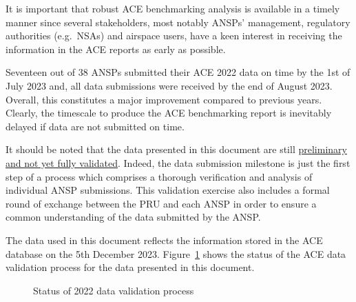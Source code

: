 \documentclass[
  letterpaper,
  DIV=11,
  numbers=noendperiod]{scrreprt}
\begin{document}
It is important that robust ACE benchmarking analysis is available in a
timely manner since several stakeholders, most notably ANSPs'
management, regulatory authorities (e.g.~NSAs) and airspace users, have
a keen interest in receiving the information in the ACE reports as early
as possible.

Seventeen out of 38 ANSPs submitted their ACE 2022 data on time by the
1st of July 2023 and, all data submissions were received by the end of
August 2023. Overall, this constitutes a major improvement compared to
previous years. Clearly, the timescale to produce the ACE benchmarking
report is inevitably delayed if data are not submitted on time.

It should be noted that the data presented in this document are still
\ul{preliminary and not yet fully validated}. Indeed, the data
submission milestone is just the first step of a process which comprises
a thorough verification and analysis of individual ANSP submissions.
This validation exercise also includes a formal round of exchange
between the PRU and each ANSP in order to ensure a common understanding
of the data submitted by the ANSP.

The data used in this document reflects the information stored in the
ACE database on the 5th December 2023. Figure~\ref{fig-figure-1-2} shows
the status of the ACE data validation process for the data presented in
this document.

\begin{figure}


\caption{\label{fig-figure-1-2}Status of 2022 data validation process}

\end{figure}%
\end{document}
